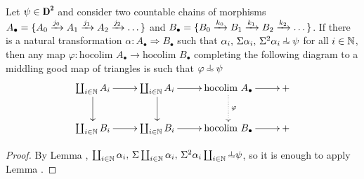 \begin{lemma}\label{horth_colimits}
Let $\psi\in\cD^\due$ and consider two countable chains of morphisms $A_\bullet = \{A_0\xrightarrow{j_0}A_1\xrightarrow{j_1}A_2\xrightarrow{j_2}\dots\}$ and $B_\bullet = \{B_0\xrightarrow{k_0}B_1\xrightarrow{k_1}B_2\xrightarrow{k_2}\dots\}$.  If there is a natural transformation $\alpha\colon A_\bullet \Rightarrow B_\bullet$ such that $\alpha_i,\, \Sigma \alpha_i,\, \Sigma^2 \alpha_i\horth \psi$ for all $i\in\mathbb{N}$, then any map $\varphi\colon  \text{hocolim } A_\bullet\to  \text{hocolim } B_\bullet$ completing the following diagram to a middling good map of triangles is such that $\varphi\horth \psi$
\[
\xymatrix{
	\coprod_{i\in\N} A_i \ar[d]\ar[r] & \coprod_{i\in\N} A_i \ar[d]\ar[r] & \text{hocolim } A_\bullet \ar[r]\ar@{.>}[d]^{\varphi} & +\\
	\coprod_{i\in\N} B_i \ar[r] & \coprod_{i\in\N} B_i \ar[r] & \text{hocolim } B_\bullet \ar[r] & +
}
\]
\end{lemma}
\begin{proof}
By Lemma , $\coprod_{i\in\N} \alpha_i,\, \Sigma\coprod_{i\in\N} \alpha_i,\, \Sigma^2\alpha_i\coprod_{i\in\N}\horth \psi$, so it is enough to apply Lemma .
\end{proof}
